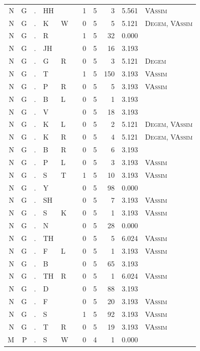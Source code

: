 \documentclass[12pt]{article}
\begin{document}
\begin{longtable}{r@{ } r@{ } c@{ } l@{ } l@{ } l@{ } r r r r l }
N & G & . & HH &  &  & 1 & 5 & 3 & 5.561 & \textsc{VAssim} \\
N & G & . & K & W &  & 0 & 5 & 5 & 5.121 & \textsc{Degem}, \textsc{VAssim} \\
N & G & . & R &  &  & 1 & 5 & 32 & 0.000 &  \\
N & G & . & JH &  &  & 0 & 5 & 16 & 3.193 &  \\
N & G & . & G & R &  & 0 & 5 & 3 & 5.121 & \textsc{Degem} \\
N & G & . & T &  &  & 1 & 5 & 150 & 3.193 & \textsc{VAssim} \\
N & G & . & P & R &  & 0 & 5 & 5 & 3.193 & \textsc{VAssim} \\
N & G & . & B & L &  & 0 & 5 & 1 & 3.193 &  \\
N & G & . & V &  &  & 0 & 5 & 18 & 3.193 &  \\
N & G & . & K & L &  & 0 & 5 & 2 & 5.121 & \textsc{Degem}, \textsc{VAssim} \\
N & G & . & K & R &  & 0 & 5 & 4 & 5.121 & \textsc{Degem}, \textsc{VAssim} \\
N & G & . & B & R &  & 0 & 5 & 6 & 3.193 &  \\
N & G & . & P & L &  & 0 & 5 & 3 & 3.193 & \textsc{VAssim} \\
N & G & . & S & T &  & 1 & 5 & 10 & 3.193 & \textsc{VAssim} \\
N & G & . & Y &  &  & 0 & 5 & 98 & 0.000 &  \\
N & G & . & SH &  &  & 0 & 5 & 7 & 3.193 & \textsc{VAssim} \\
N & G & . & S & K &  & 0 & 5 & 1 & 3.193 & \textsc{VAssim} \\
N & G & . & N &  &  & 0 & 5 & 28 & 0.000 &  \\
N & G & . & TH &  &  & 0 & 5 & 5 & 6.024 & \textsc{VAssim} \\
N & G & . & F & L &  & 0 & 5 & 1 & 3.193 & \textsc{VAssim} \\
N & G & . & B &  &  & 0 & 5 & 65 & 3.193 &  \\
N & G & . & TH & R &  & 0 & 5 & 1 & 6.024 & \textsc{VAssim} \\
N & G & . & D &  &  & 0 & 5 & 88 & 3.193 &  \\
N & G & . & F &  &  & 0 & 5 & 20 & 3.193 & \textsc{VAssim} \\
N & G & . & S &  &  & 1 & 5 & 92 & 3.193 & \textsc{VAssim} \\
N & G & . & T & R &  & 0 & 5 & 19 & 3.193 & \textsc{VAssim} \\
M & P & . & S & W &  & 0 & 4 & 1 & 0.000 &  \\

\end{longtable}
\end{document}
